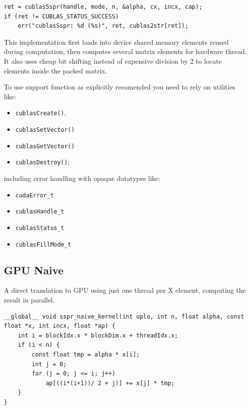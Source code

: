 \documentclass{llncs}
\begin{document}
\begin{lstlisting}[caption={cuBLAS SSPR GPU Implementation}, label={lst:gpucublas}]
ret = cublasSspr(handle, mode, n, &alpha, cx, incx, cap);
if (ret != CUBLAS_STATUS_SUCCESS)
	err("cublasSspr: %d (%s)", ret, cublas2str[ret]);
\end{lstlisting}

This implementation first loads into device shared memory elements reused during computation, then computes several matrix elements for hardware thread. It also uses cheap bit shifting instead of expensive division by 2 to locate elements inside the packed matrix.

To use support function as explicitly recomended you need to rely on utilities like:

\begin{itemize}
\item {\tt cublasCreate()}, 
\item {\tt cublasSetVector()}
\item {\tt cublasGetVector()}
\item {\tt cublasDestroy()};
\end{itemize}

including error handling with opaque datatypes like:

\begin{itemize}
\item {\tt cudaError\_t}
\item {\tt cublasHandle\_t}
\item {\tt cublasStatus\_t}
\item {\tt cublasFillMode\_t}
\end{itemize}

\subsection{GPU Naive}

A direct translation to GPU using just one thread per X element, computing the result in parallel.

\begin{lstlisting}[caption={Naive SSPR GPU Implementation},label={lst:gpunaive}]
__global__ void sspr_naive_kernel(int uplo, int n, float alpha, const float *x, int incx, float *ap) {
	int i = blockIdx.x * blockDim.x + threadIdx.x;
	if (i < n) {
		const float tmp = alpha * x[i];
		int j = 0;
		for (j = 0; j <= i; j++)
			ap[((i*(i+1))/ 2 + j)] += x[j] * tmp;
	}
}
\end{lstlisting}
\end{document}
